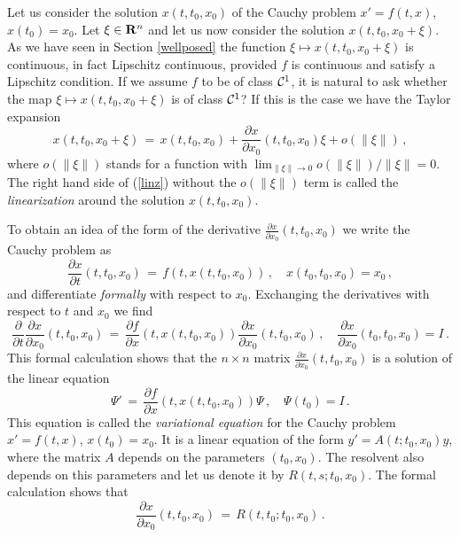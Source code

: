\documentclass[12pt]{report}
\newcommand{\calC}{{\cal C}}
\newcommand{\bR}{{\bf R}}
\def\eqref#1{(\ref{#1})}
\def\to{\rightarrow}
\begin{document}
Let us consider the solution $x(t,t_0,x_0)$ of the Cauchy problem 
$x'=f(t,x)$, $x(t_0)=x_0$. Let $\xi \in \bR^n$ and let us now consider 
the solution $x(t,t_0,x_0+\xi)$. As we have seen in Section 
\ref{wellposed} the function $\xi \mapsto x(t,t_0,x_0+\xi)$ is 
continuous, in fact Lipschitz continuous, provided $f$ is continuous 
and satisfy a Lipschitz condition.  If we assume $f$ to be of class $\calC^1$, it is natural 
to ask whether the map  $\xi \mapsto x(t,t_0,x_0+\xi)$ is of class $\calC^1$? 
If this is the case we have  the Taylor expansion 
\begin{equation}\label{linz}
x(t,t_0, x_0+\xi) \,=\, x(t,t_0, x_0) + \frac{\partial x}{\partial x_0} 
(t,t_0,x_0) \xi +o(\|\xi\|) \,,
\end{equation}
where $o(\|\xi\|)$ stands for a function with $\lim_{\|\xi\|\to 0}
o(\|\xi\|)/\|\xi\| =0$. The right hand side of \eqref{linz} without 
the $o(\|\xi\|)$ term is called  the {\em linearization} around the 
solution $x(t,t_0,x_0)$. 


To obtain an idea of the form of the derivative 
$\frac{\partial x}{\partial x_0}(t,t_0,x_0)$ we write the Cauchy
problem as
\begin{equation}
\frac{\partial x}{\partial t}(t,t_0,x_0) \,=\, f(t, x(t,t_0,x_0))\,,
\quad x(t_0, t_0, x_0) = x_0\,,
\end{equation} 
and differentiate {\em formally} with respect to $x_0$. Exchanging the
derivatives with respect to $t$ and $x_0$ we find
\begin{equation}
\frac{\partial }{\partial t}\frac{\partial x}{\partial
x_0}(t,t_0,x_0) \,=\, \frac{\partial f}{\partial x}(t, x(t,t_0,x_0))
\frac{\partial x}{\partial x_0}(t,t_0,x_0) \,, \quad \frac{\partial
x}{\partial x_0}(t_0, t_0, x_0) = I \,.
\end{equation} 
This formal calculation shows that the $n\times n$ matrix 
$\frac{\partial x}{\partial x_0}(t,t_0,x_0)$ is a solution of the 
linear equation
\begin{equation}\label{vareq}
\Psi' \,=\, \frac{\partial f}{\partial x}(t, x(t,t_0,x_0)) \Psi\,, \quad 
\Psi(t_0) = I \,.
\end{equation}
This equation is called the {\em variational equation} for the 
Cauchy problem $x'=f(t,x)$, $x(t_0)=x_0$. It is a linear equation of
the form $y'=A(t ; t_0,x_0)y$, where the matrix $A$ depends on the
parameters $(t_0,x_0)$.  The resolvent also depends on this parameters
and let us denote it by $R(t,s; t_0,x_0)$.  The formal calculation shows
that
\begin{equation}
\frac{\partial x}{\partial x_0}(t,t_0,x_0)\,=\, R(t,t_0; t_0,x_0) \,.
\end{equation}
\end{document}
